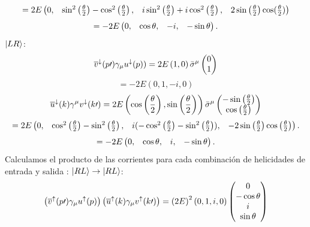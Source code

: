 \documentclass{article}
\theoremstyle{plain}
\theoremstyle{definition}
\newcommand{\sinthetahalf}{{\sin\left(\frac{\theta}{2}\right)}}
\begin{document}
	\[= 2E\left(\begin{array}{@{}cccc@{}}
	0,&
	\sin^2\left(\frac{\theta}{2}\right) - \cos^2\left(\frac{\theta}{2}\right),& i\sin^2\left(\frac{\theta}{2}\right) + i\cos^2\left(\frac{\theta}{2}\right),& 2\sin\left(\frac{\theta}{2}\right)\cos({\frac{\theta}{2}}) \end{array}\right)\]
	\[= -2E\left(\begin{array}{@{}cccc@{}}
	0,&
	\cos\theta,& -i,& -\sin\theta \end{array}\right)\text{.}\]\newline
	\underline{\(\ket{LR}\)}:\newline\newline	
	\[\overline{v}^\downarrow(p\prime)\gamma_{\mu}u^\downarrow(p))=2E\left(1,0\right)\bar\sigma^\mu\left(\begin{array}{@{}c@{}}
	0\\1\end{array}\right) 
	\]
	\[= -2E(0,1,-i,0)\]
	\[\overline{u}^\downarrow(k)\gamma^{\mu}v^\downarrow(k\prime)=2E\left(\cos\left(\frac{\theta}{2}\right), \sinthetahalf \right)\bar\sigma^\mu\left(\begin{array}{@{}c@{}}
	-\sin\left(\frac{\theta}{2}\right)\\
	\cos\left(\frac{\theta}{2}\right)\end{array}\right)
	\]
	\[=2E\left(\begin{array}{@{}cccc@{}}
	0,&
	\cos^2\left(\frac{\theta}{2}\right)-\sin^2\left(\frac{\theta}{2}\right),&
	i(-\cos^2\left(\frac{\theta}{2}\right)-\sin^2\left(\frac{\theta}{2}\right)),&
	-2\sin\left(\frac{\theta}{2}\right)\cos\left(\frac{\theta}{2}\right)
	\end{array}\right)\text{.}
	\]
	\[= -2E\left(\begin{array}{@{}cccc@{}}
	0,&
	\cos\theta,& i,& -\sin\theta \end{array}\right)\text{.}\]\newline
	Calculamos el producto de las corrientes para cada combinación de helicidades de entrada y salida :\newline
	\newline
	\underline{\(\ket{RL}\rightarrow\ket{RL}\)}:
	\[\left( \overline{v}^\uparrow(p\prime)\gamma_{\mu}u^\uparrow(p) \right)
	\left(\overline{u}^\uparrow(k)\gamma_{\mu}v^\uparrow(k\prime) \right)= \left(2E\right)^2\left(0,1,i,0\right)
	\left(\begin{array}{@{}c@{}}
	0\\
	-\cos\theta\\
	i\\
	\sin\theta
	\end{array}\right) \]
\end{document}
